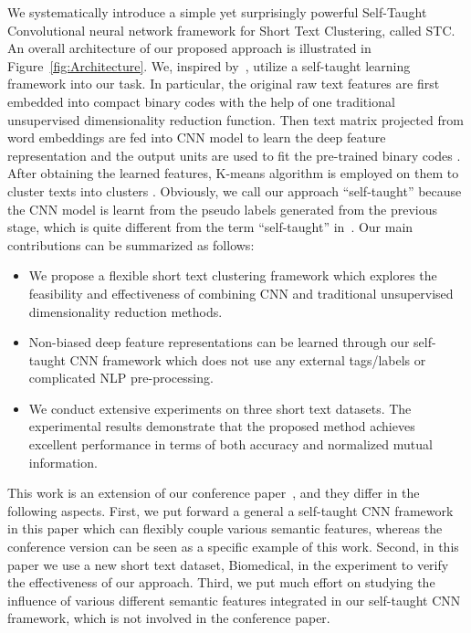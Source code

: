 \documentclass[review]{elsarticle}
\begin{document}
We systematically introduce a simple yet surprisingly powerful Self-Taught Convolutional neural network framework for Short Text Clustering, called STC. An overall architecture of our proposed approach is illustrated in Figure~\ref{fig:Architecture}. We, inspired by~\cite{28_zhang2010self,TwoStepHash_Lin_2013}, utilize a self-taught learning framework into our task. In particular, the original raw text features are first embedded into compact binary codes  with the help of one traditional unsupervised dimensionality reduction function. Then text matrix  projected from word embeddings are fed into CNN model to learn the deep feature representation  and the output units are used to fit the pre-trained binary codes . After obtaining the learned features, K-means algorithm is employed on them to cluster texts into clusters . Obviously, we call our approach ``self-taught'' because the CNN model is learnt from the pseudo labels generated from the previous stage, which is quite different from the term ``self-taught'' in~\cite{raina2007self}.
Our main contributions can be summarized as follows:

\begin{itemize}
  \item We propose a flexible short text clustering framework which explores the feasibility and effectiveness of combining CNN and traditional unsupervised dimensionality reduction methods.
  \item Non-biased deep feature representations can be learned through our self-taught CNN framework which does not use any external tags/labels or complicated NLP pre-processing.
  \item We conduct extensive experiments on three short text datasets. The experimental results demonstrate that the proposed method achieves excellent performance in terms of both accuracy and normalized mutual information.
\end{itemize}

This work is an extension of our conference paper~\cite{xu2015short}, and they differ in the following aspects. First, we put forward a general a self-taught CNN framework in this paper which can flexibly couple various semantic features, whereas the conference version can be seen as a specific example of this work. Second, in this paper we use a new short text dataset, Biomedical, in the experiment to verify the effectiveness of our approach. Third, we put much effort on studying the influence of various different semantic features integrated in our self-taught CNN framework, which is not involved in the conference paper.
\end{document}
